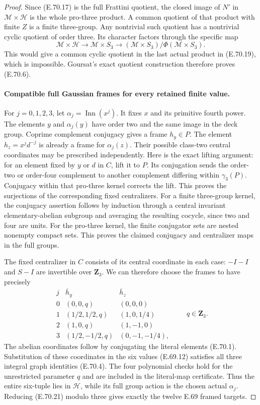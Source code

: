 \begin{proof}
Since (E.70.17) is the full Frattini quotient,
the closed image of $N'$ in $\mathcal M\times\mathscr H$
is the whole pro-three product. A common quotient
of that product with finite $Z$ is a finite
three-group. Any nontrivial such quotient has a
nontrivial cyclic quotient of order three. Its
character factors through the specific map
\[
 \mathcal M\times\mathscr H
       \longrightarrow\mathcal M\times S_3
       \longrightarrow
          (\mathcal M\times S_3)/\Phi(\mathcal M\times S_3).
 \tag{E.70.20}
\]
This would give a common cyclic quotient in the
last actual product in (E.70.19), which is
impossible. Goursat's exact quotient construction
therefore proves (E.70.6).

\paragraph{Compatible full Gaussian frames for every retained finite value.}
For $j=0,1,2,3$, let $\alpha_j=\operatorname{Inn}(x^j)$.
It fixes $x$ and its primitive fourth power.
The elements $y$ and $\alpha_j(y)$ have order two
and the same image in the deck group. Coprime
complement conjugacy gives a frame $h_y\in P$.
The element $h_z=x^jd^{-j}$ is already a frame for
$\alpha_j(z)$. Their possible class-two central
coordinates may be prescribed independently.
Here is the exact lifting argument: for an element
fixed by $y$ or $d$ in $C$, lift it to $P$. Its
conjugation sends the order-two or order-four
complement to another complement differing within
$\gamma_3(P)$. Conjugacy within that pro-three
kernel corrects the lift. This proves the
surjections of the corresponding fixed centralizers.
For a finite three-group kernel, the conjugacy
assertion follows by induction through a central
invariant elementary-abelian subgroup and averaging
the resulting cocycle, since two and four are units.
For the pro-three kernel, the finite conjugator sets
are nested nonempty compact sets. This proves the
claimed conjugacy and centralizer maps in the full
groups.

The fixed centralizer in $C$ consists of its central
coordinate in each case: $-I-I$ and $S-I$ are
invertible over $\mathbf Z_3$. We can therefore
choose the frames to have precisely
\[
 \begin{array}{c|c|c}
 j&\overline h_y&\overline h_z\\ \hline
 0&(0,0,q)&(0,0,0)\\
 1&(1/2,1/2,q)&(1,0,1/4)\\
 2&(1,0,q)&(1,-1,0)\\
 3&(1/2,-1/2,q)&(0,-1,-1/4),
 \end{array}
 \qquad q\in\mathbf Z_3.
 \tag{E.70.21}
\]
The abelian coordinates follow by conjugating the
literal elements (E.70.1). Substitution of these
coordinates in the six values (E.69.12) satisfies
all three integral graph identities (E.70.4).
The four polynomial checks hold for the unrestricted
parameter $q$ and are included in the literal-map
certificate. Thus the entire six-tuple lies in
$\mathscr H$, while its full group action is the
chosen actual $\alpha_j$. Reducing (E.70.21) modulo
three gives exactly the twelve E.69 framed targets.


\end{proof}
